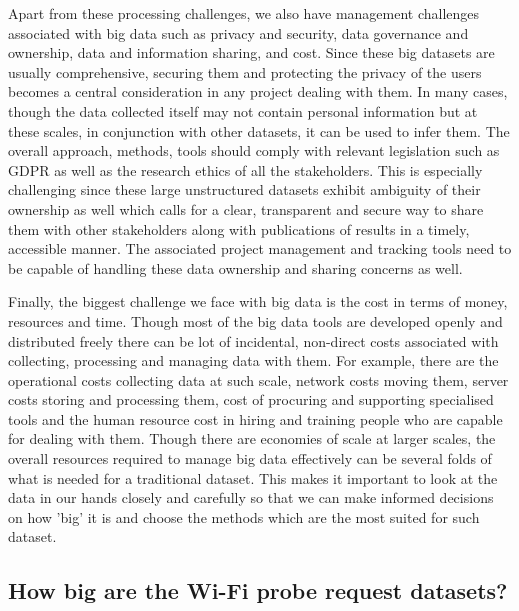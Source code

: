 Apart from these processing challenges, we also have management challenges associated with big data such as privacy and security, data governance and ownership, data and information sharing, and cost\cite{jagadish2014}.
Since these big datasets are usually comprehensive, securing them and protecting the privacy of the users becomes a central consideration in any project dealing with them.
In many cases, though the data collected itself may not contain personal information but at these scales, in conjunction with other datasets, it can be used to infer them.
The overall approach, methods, tools should comply with relevant legislation such as GDPR as well as the research ethics of all the stakeholders.
This is especially challenging since these large unstructured datasets exhibit ambiguity of their ownership as well which calls for a clear, transparent and secure way to share them with other stakeholders along with publications of results in a timely, accessible manner.
The associated project management and tracking tools need to be capable of handling these data ownership and sharing concerns as well.

Finally, the biggest challenge we face with big data is the cost in terms of money, resources and time.
Though most of the big data tools are developed openly and distributed freely there can be lot of incidental, non-direct costs associated with collecting, processing and managing data with them.
For example, there are the operational costs collecting data at such scale, network costs moving them, server costs storing and processing them, cost of procuring and supporting specialised tools and the human resource cost in hiring and training people who are capable for dealing with them.
Though there are economies of scale at larger scales, the overall resources required to manage big data effectively can be several folds of what is needed for a traditional dataset. 
This makes it important to look at the data in our hands closely and carefully so that we can make informed decisions on how 'big' it is and choose the methods which are the most suited for such dataset.


\subsection{How big are the Wi-Fi probe request datasets?}

